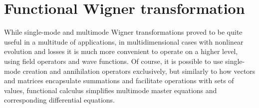 \chapter{Functional Wigner transformation}
\label{cha:wigner}

While single-mode and multimode Wigner transformations proved to be quite useful in a multitude of applications, in multidimensional cases with nonlinear evolution and losses it is much more convenient to operate on a higher level, using field operators and wave functions.
Of course, it is possible to use single-mode creation and annihilation operators exclusively,
but similarly to how vectors and matrices encapsulate summations and facilitate operations with sets of values, functional calculus simplifies multimode master equations and corresponding differential equations.




